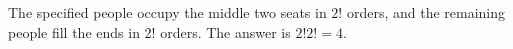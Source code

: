 The specified people occupy the middle two seats in $2!$ orders, and the remaining people fill the ends in $2!$ orders. The answer is $2!2!=\boxed4$.
